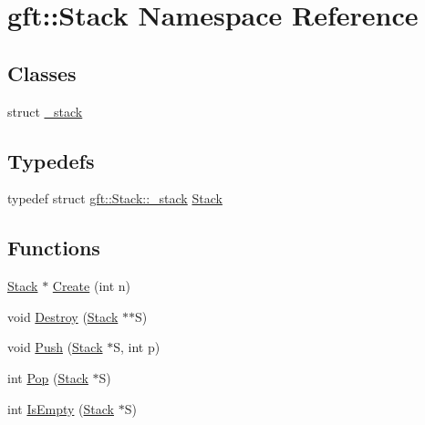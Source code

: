 \hypertarget{namespacegft_1_1Stack}{\section{gft\-:\-:Stack Namespace Reference}
\label{namespacegft_1_1Stack}
}
\subsection*{Classes}
\begin{DoxyCompactItemize}
\item 
struct \hyperlink{structgft_1_1Stack_1_1__stack}{\-\_\-stack}
\end{DoxyCompactItemize}
\subsection*{Typedefs}
\begin{DoxyCompactItemize}
\item 
typedef struct \hyperlink{structgft_1_1Stack_1_1__stack}{gft\-::\-Stack\-::\-\_\-stack} \hyperlink{namespacegft_1_1Stack_a89a469f09b9a61ef875fcbc17ca91f5d}{Stack}
\end{DoxyCompactItemize}
\subsection*{Functions}
\begin{DoxyCompactItemize}
\item 
\hyperlink{namespacegft_1_1Stack_a89a469f09b9a61ef875fcbc17ca91f5d}{Stack} $\ast$ \hyperlink{namespacegft_1_1Stack_aae4b11552918128f72c2c0ce6769ea00}{Create} (int n)
\item 
void \hyperlink{namespacegft_1_1Stack_ac9833a76111d61f284fe131a8439ea79}{Destroy} (\hyperlink{namespacegft_1_1Stack_a89a469f09b9a61ef875fcbc17ca91f5d}{Stack} $\ast$$\ast$S)
\item 
void \hyperlink{namespacegft_1_1Stack_a9d1618c9defa1ad3e683b7c57d0e3075}{Push} (\hyperlink{namespacegft_1_1Stack_a89a469f09b9a61ef875fcbc17ca91f5d}{Stack} $\ast$S, int p)
\item 
int \hyperlink{namespacegft_1_1Stack_a58729721489e11127a35700782ed0ae2}{Pop} (\hyperlink{namespacegft_1_1Stack_a89a469f09b9a61ef875fcbc17ca91f5d}{Stack} $\ast$S)
\item 
int \hyperlink{namespacegft_1_1Stack_ae0d7bdd894199837f622eebc8d0f77be}{Is\-Empty} (\hyperlink{namespacegft_1_1Stack_a89a469f09b9a61ef875fcbc17ca91f5d}{Stack} $\ast$S)
\end{DoxyCompactItemize}


